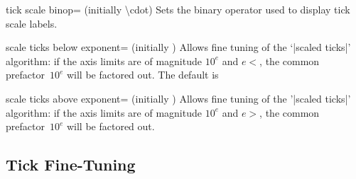 \begin{pgfplotskey}{tick scale binop= (initially \textbackslash cdot)}
    Sets the binary operator used to display tick scale labels.
\begin{codeexample}[]
\end{codeexample}

\begin{codeexample}[]
\end{codeexample}
\end{pgfplotskey}

\makeatletter
    \let\itsinitial=\pgfplots@scale@ticks@below@exponent
\makeatother
\begin{pgfplotskey}{scale ticks below exponent= (initially \itsinitial)}
    Allows fine tuning of the `|scaled ticks|' algorithm: if the axis limits
    are of magnitude $10^e$ and $e<$, the common
    prefactor~$10^e$ will be factored out. The default is
\end{pgfplotskey}

\makeatletter
    \let\itsinitial=\pgfplots@scale@ticks@above@exponent
\makeatother
\begin{pgfplotskey}{scale ticks above exponent= (initially \itsinitial)}
    Allows fine tuning of the '|scaled ticks|' algorithm: if the axis limits
    are of magnitude $10^e$ and $e>$, the common
    prefactor~$10^e$ will be factored out.
\end{pgfplotskey}


\subsection{Tick Fine-Tuning}

